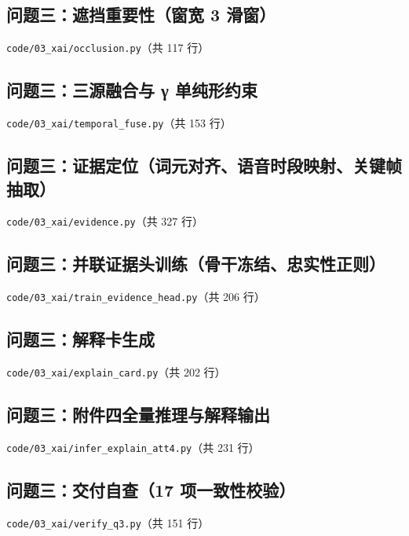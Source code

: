 \subsection{问题三：遮挡重要性（窗宽 3 滑窗）}
\noindent\texttt{code/03\_xai/occlusion.py}（共 117 行）


\subsection{问题三：三源融合与 γ 单纯形约束}
\noindent\texttt{code/03\_xai/temporal\_fuse.py}（共 153 行）


\subsection{问题三：证据定位（词元对齐、语音时段映射、关键帧抽取）}
\noindent\texttt{code/03\_xai/evidence.py}（共 327 行）


\subsection{问题三：并联证据头训练（骨干冻结、忠实性正则）}
\noindent\texttt{code/03\_xai/train\_evidence\_head.py}（共 206 行）


\subsection{问题三：解释卡生成}
\noindent\texttt{code/03\_xai/explain\_card.py}（共 202 行）


\subsection{问题三：附件四全量推理与解释输出}
\noindent\texttt{code/03\_xai/infer\_explain\_att4.py}（共 231 行）


\subsection{问题三：交付自查（17 项一致性校验）}
\noindent\texttt{code/03\_xai/verify\_q3.py}（共 151 行）

